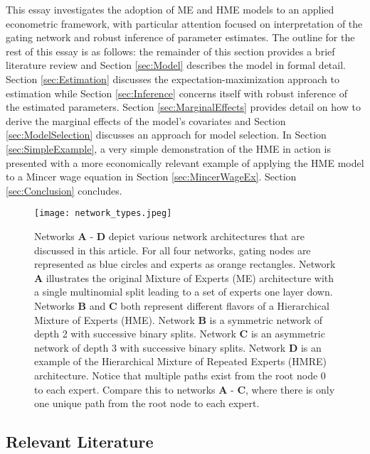 \documentclass[12pt]{article}
\theoremstyle{definition}
\begin{document}
\bigskip

This essay investigates the adoption of ME and HME models to an applied econometric framework, with particular attention focused on interpretation of the gating network and robust inference of parameter estimates. The outline for the rest of this essay is as follows: the remainder of this section provides a brief literature review and Section \ref{sec:Model} describes the model in formal detail. Section \ref{sec:Estimation} discusses the expectation-maximization approach to estimation while Section \ref{sec:Inference} concerns itself with robust inference of the estimated parameters. Section \ref{sec:MarginalEffects} provides detail on how to derive the marginal effects of the model's covariates and Section \ref{sec:ModelSelection} discusses an approach for model selection. In Section \ref{sec:SimpleExample}, a very simple demonstration of the HME in action is presented with a more economically relevant example of applying the HME model to a Mincer wage equation in Section \ref{sec:MincerWageEx}. Section \ref{sec:Conclusion} concludes.

\begin{figure}[!ht]
  \centering
  \texttt{[image: network\_types.jpeg]}
  \caption{Networks \textbf{A} - \textbf{D} depict various network   architectures that are discussed in this article. For all four networks, gating nodes are represented as blue circles and experts as orange rectangles. Network \textbf{A} illustrates the original Mixture of Experts (ME) architecture with a single multinomial split leading to a set of experts one layer down. Networks \textbf{B} and \textbf{C} both represent different flavors of a Hierarchical Mixture of Experts (HME). Network \textbf{B} is a symmetric network of depth 2 with successive binary splits. Network \textbf{C} is an asymmetric network of depth 3 with successive binary splits. Network \textbf{D} is an example of the Hierarchical Mixture of Repeated Experts (HMRE) architecture. Notice that multiple paths exist from the root node $0$ to each expert. Compare this to networks \textbf{A} - \textbf{C}, where there is only one unique path from the root node to each expert.}
  \label{fig:network_comparison}
\end{figure}


\subsection{Relevant Literature}
\end{document}
